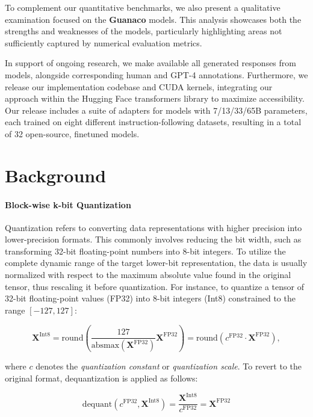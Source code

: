 To complement our quantitative benchmarks, we also present a qualitative examination focused on the \textbf{Guanaco} models. This analysis showcases both the strengths and weaknesses of the models, particularly highlighting areas not sufficiently captured by numerical evaluation metrics.

In support of ongoing research, we make available all generated responses from models, alongside corresponding human and GPT-4 annotations. Furthermore, we release our implementation codebase and CUDA kernels, integrating our approach within the Hugging Face transformers library \citep{wolf2019huggingface} to maximize accessibility. Our release includes a suite of adapters for models with 7/13/33/65B parameters, each trained on eight different instruction-following datasets, resulting in a total of 32 open-source, finetuned models.

\section{Background}
\paragraph{Block-wise k-bit Quantization} Quantization refers to converting data representations with higher precision into lower-precision formats. This commonly involves reducing the bit width, such as transforming 32-bit floating-point numbers into 8-bit integers. To utilize the complete dynamic range of the target lower-bit representation, the data is usually normalized with respect to the maximum absolute value found in the original tensor, thus rescaling it before quantization. For instance, to quantize a tensor of 32-bit floating-point values (FP32) into 8-bit integers (Int8) constrained to the range $[-127, 127]$:

\begin{equation}
    \mathbf{X}^{ \text{Int8}} = \text{round}\left( \frac{127}{{\text{absmax}}(\mathbf{X}^{{\text{FP32}}})}\mathbf{X}^{{\text{FP32}}} \right) = \text{round}(c^{\text{FP32}}\cdot \mathbf{X}^{{\text{FP32}}}),
\end{equation}

where $c$ denotes the {\em quantization constant} or {\em quantization scale}. To revert to the original format, dequantization is applied as follows:

\begin{equation}
    \text{dequant}(c^{\text{FP32}}, \mathbf{X}^{\text{Int8}}) = \frac{\mathbf{X}^{\text{Int8}}}{c^{\text{FP32}}} = \mathbf{X}^{\text{FP32}}
\end{equation}

